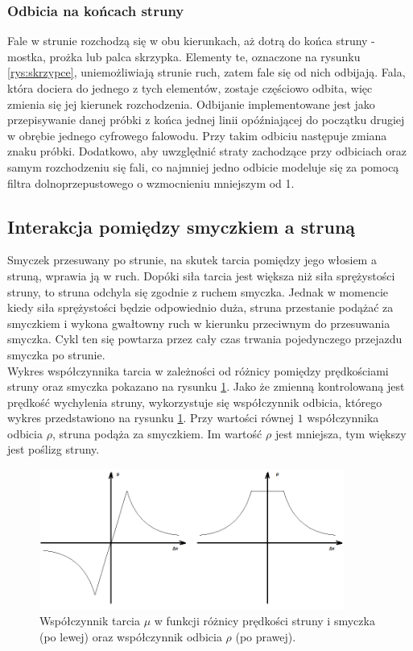 \subsubsection{Odbicia na końcach struny}
Fale w strunie rozchodzą się w obu kierunkach, aż dotrą do końca struny - mostka, prożka lub palca skrzypka. Elementy te, oznaczone na rysunku \ref{rys:skrzypce}, uniemożliwiają strunie ruch, zatem fale się od nich odbijają. Fala, która dociera do jednego z tych elementów, zostaje częściowo odbita, więc zmienia się jej kierunek rozchodzenia. Odbijanie implementowane jest jako przepisywanie danej próbki z końca jednej linii opóźniającej do początku drugiej w obrębie jednego cyfrowego falowodu. Przy takim odbiciu następuje zmiana znaku próbki.
Dodatkowo, aby uwzględnić straty zachodzące przy odbiciach oraz samym rozchodzeniu się fali, co najmniej jedno odbicie modeluje się za pomocą filtra dolnoprzepustowego o wzmocnieniu mniejszym od 1.


\subsection{Interakcja pomiędzy smyczkiem a struną}
Smyczek przesuwany po strunie, na skutek tarcia pomiędzy jego włosiem a struną, wprawia ją w ruch. Dopóki siła tarcia jest większa niż siła sprężystości struny, to struna odchyla się zgodnie z ruchem smyczka. Jednak w momencie kiedy siła sprężystości będzie odpowiednio duża, struna przestanie podążać za smyczkiem i wykona gwałtowny ruch w kierunku przeciwnym do przesuwania smyczka.  Cykl ten się powtarza przez cały czas trwania pojedynczego przejazdu smyczka po strunie.  \\
Wykres współczynnika tarcia w zależności od różnicy pomiędzy prędkościami struny oraz smyczka pokazano na rysunku \ref{rys:tarcie}. Jako że zmienną kontrolowaną jest prędkość wychylenia struny, wykorzystuje się współczynnik odbicia, którego wykres przedstawiono na rysunku \ref{rys:tarcie}. Przy wartości równej $1$ współczynnika odbicia $\rho$, struna podąża za smyczkiem. Im wartość $\rho$ jest mniejsza, tym większy jest poślizg struny.

\begin{figure}[H]
	\centering
	\includegraphics[width=10cm]{grafiki/tarcie2}
	\captionsetup{justification=centering}
	\caption{Współczynnik tarcia $\mu$ w funkcji różnicy prędkości struny i smyczka (po lewej) oraz współczynnik odbicia $\rho$ (po prawej).}
	\label{rys:tarcie}
\end{figure}

